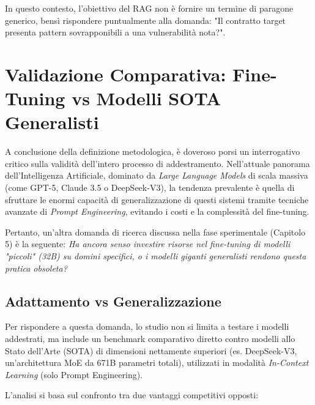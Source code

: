 In questo contesto, l'obiettivo del RAG non è fornire un termine di paragone generico, bensì rispondere puntualmente alla domanda: "Il contratto target presenta pattern sovrapponibili a una vulnerabilità nota?".

\section{Validazione Comparativa: Fine-Tuning vs Modelli SOTA Generalisti}
\label{sec:finetuning_rationale}

A conclusione della definizione metodologica, è doveroso porsi un interrogativo critico sulla validità dell'intero processo di addestramento. Nell'attuale panorama dell'Intelligenza Artificiale, dominato da \textit{Large Language Models} di scala massiva (come GPT-5, Claude 3.5 o DeepSeek-V3), la tendenza prevalente è quella di sfruttare le enormi capacità di generalizzazione di questi sistemi tramite tecniche avanzate di \textit{Prompt Engineering}, evitando i costi e la complessità del fine-tuning.

Pertanto, un'altra domanda di ricerca discussa nella fase sperimentale (Capitolo 5) è la seguente: \textit{Ha ancora senso investire risorse nel fine-tuning di modelli "piccoli" (32B) su domini specifici, o i modelli giganti generalisti rendono questa pratica obsoleta?}

\subsection{Adattamento vs Generalizzazione}
Per rispondere a questa domanda, lo studio non si limita a testare i modelli addestrati, ma include un benchmark comparativo diretto contro modelli allo Stato dell'Arte (SOTA) di dimensioni nettamente superiori (es. DeepSeek-V3, un'architettura MoE da 671B parametri totali), utilizzati in modalità \textit{In-Context Learning} (solo Prompt Engineering).

L'analisi si basa sul confronto tra due vantaggi competitivi opposti:

